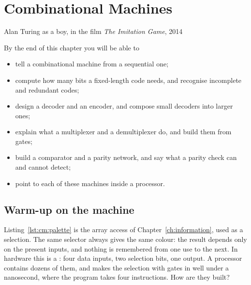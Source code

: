 \chapter{Combinational Machines}
\label{ch:combinational}

  {Alan Turing as a boy, in the film \emph{The Imitation Game}, 2014}

\begin{chapgoals}
By the end of this chapter you will be able to
\begin{itemize}
\item tell a combinational machine from a sequential one;
\item compute how many bits a fixed-length code needs, and recognise incomplete and redundant codes;
\item design a decoder and an encoder, and compose small decoders into larger ones;
\item explain what a multiplexer and a demultiplexer do, and build them from gates;
\item build a comparator and a parity network, and say what a parity check can and cannot detect;
\item point to each of these machines inside a \riscv processor.
\end{itemize}
\end{chapgoals}


\section{Warm-up on the machine}


Listing~\ref{lst:cm:palette} is the array access of
Chapter~\ref{ch:information}, used as a selection. The same selector always
gives the same colour: the result depends only on the present inputs, and
nothing is remembered from one use to the next. In hardware this is a
: four data inputs, two selection bits, one output. A
processor contains dozens of them, and makes the selection with gates in well
under a nanosecond, where the program takes four instructions. How are they
built?

